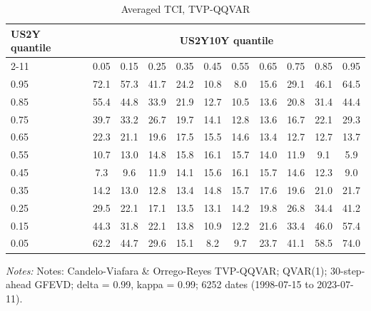 \begin{table}[htbp]\centering
\caption{Averaged TCI, TVP-QQVAR}\label{tab:qqconn}
\small
\begin{tabular}{lcccccccccc}
\toprule
US2Y quantile & \multicolumn{10}{c}{US2Y10Y quantile} \\
\cmidrule(lr){2-11}
 & 0.05 & 0.15 & 0.25 & 0.35 & 0.45 & 0.55 & 0.65 & 0.75 & 0.85 & 0.95 \\
\midrule
0.95 & 72.1 & 57.3 & 41.7 & 24.2 & 10.8 & 8.0 & 15.6 & 29.1 & 46.1 & 64.5 \\
0.85 & 55.4 & 44.8 & 33.9 & 21.9 & 12.7 & 10.5 & 13.6 & 20.8 & 31.4 & 44.4 \\
0.75 & 39.7 & 33.2 & 26.7 & 19.7 & 14.1 & 12.8 & 13.6 & 16.7 & 22.1 & 29.3 \\
0.65 & 22.3 & 21.1 & 19.6 & 17.5 & 15.5 & 14.6 & 13.4 & 12.7 & 12.7 & 13.7 \\
0.55 & 10.7 & 13.0 & 14.8 & 15.8 & 16.1 & 15.7 & 14.0 & 11.9 & 9.1 & 5.9 \\
0.45 & 7.3 & 9.6 & 11.9 & 14.1 & 15.6 & 16.1 & 15.7 & 14.6 & 12.3 & 9.0 \\
0.35 & 14.2 & 13.0 & 12.8 & 13.4 & 14.8 & 15.7 & 17.6 & 19.6 & 21.0 & 21.7 \\
0.25 & 29.5 & 22.1 & 17.1 & 13.5 & 13.1 & 14.2 & 19.8 & 26.8 & 34.4 & 41.2 \\
0.15 & 44.3 & 31.8 & 22.1 & 13.8 & 10.9 & 12.2 & 21.6 & 33.4 & 46.0 & 57.4 \\
0.05 & 62.2 & 44.7 & 29.6 & 15.1 & 8.2 & 9.7 & 23.7 & 41.1 & 58.5 & 74.0 \\
\bottomrule
\end{tabular}
\par\smallskip\begin{minipage}{0.95\linewidth}\footnotesize\textit{Notes:} Notes: Candelo-Viafara \& Orrego-Reyes TVP-QQVAR; QVAR(1); 30-step-ahead GFEVD; delta = 0.99, kappa = 0.99; 6252 dates (1998-07-15 to 2023-07-11).\end{minipage}
\end{table}